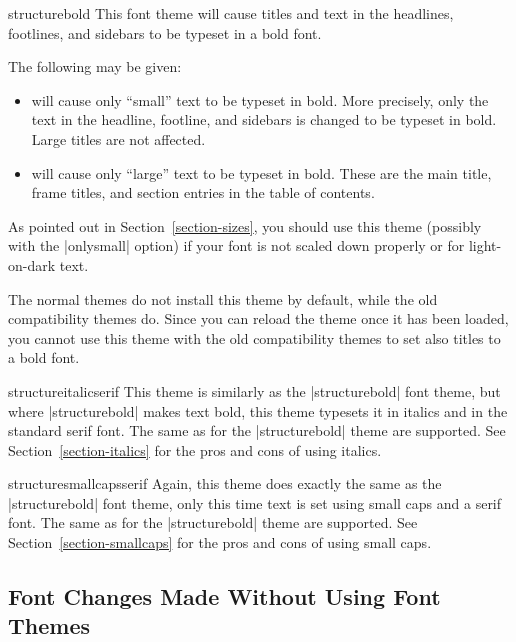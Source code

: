 \begin{fontthemeexample}{structurebold}
  This font theme will cause titles and text in the headlines, footlines, and sidebars to be typeset in a bold font.

  The following  may be given:
  \begin{itemize}
    \item
    will cause only ``small'' text to be typeset in bold. More precisely, only the text in the headline, footline, and sidebars is changed to be typeset in bold. Large titles are not affected.
    \item
    will cause only ``large'' text to be typeset in bold. These are the main title, frame titles, and section entries in the table of contents.
  \end{itemize}

  As pointed out in Section~\ref{section-sizes}, you should use this theme (possibly with the |onlysmall| option) if your font is not scaled down properly or for light-on-dark text.

  The normal themes do not install this theme by default, while the old compatibility themes do. Since you can reload the theme once it has been loaded, you cannot use this theme with the old compatibility themes to set also titles to a bold font.
\end{fontthemeexample}

\begin{fontthemeexample}{structureitalicserif}
  This theme is similarly as the |structurebold| font theme, but where |structurebold| makes text bold, this theme typesets it in italics and in the standard serif font. The same  as for the |structurebold| theme are supported. See Section~\ref{section-italics} for the pros and cons of using italics.
\end{fontthemeexample}

\begin{fontthemeexample}{structuresmallcapsserif}
  Again, this theme does exactly the same as the |structurebold| font theme, only this time text is set using small caps and a serif font. The same  as for the |structurebold| theme are supported. See Section~\ref{section-smallcaps} for the pros and cons of using small caps.
\end{fontthemeexample}


\subsection{Font Changes Made Without Using Font Themes}

